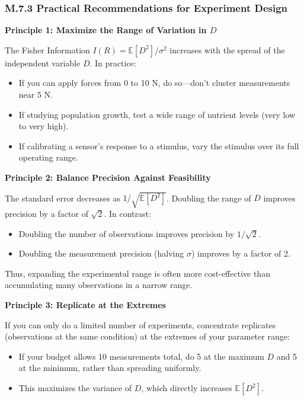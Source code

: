 \documentclass[
]{article}
\providecommand{\tightlist}{%
  \setlength{\itemsep}{0pt}\setlength{\parskip}{0pt}}
\begin{document}
\subsubsection{M.7.3 Practical Recommendations for Experiment
Design}\label{m.7.3-practical-recommendations-for-experiment-design}

\textbf{Principle 1: Maximize the Range of Variation in \(D\)}

The Fisher Information \(I(R) = \mathbb{E}[D^2]/\sigma^2\) increases
with the spread of the independent variable \(D\). In practice:

\begin{itemize}
\tightlist
\item
  If you can apply forces from 0 to 10 N, do so---don't cluster
  measurements near 5 N.
\item
  If studying population growth, test a wide range of nutrient levels
  (very low to very high).
\item
  If calibrating a sensor's response to a stimulus, vary the stimulus
  over its full operating range.
\end{itemize}

\textbf{Principle 2: Balance Precision Against Feasibility}

The standard error decreases as \(1/\sqrt{\mathbb{E}[D^2]}\). Doubling
the range of \(D\) improves precision by a factor of \(\sqrt{2}\). In
contrast:

\begin{itemize}
\tightlist
\item
  Doubling the number of observations improves precision by
  \(1/\sqrt{2}\).
\item
  Doubling the measurement precision (halving \(\sigma\)) improves by a
  factor of 2.
\end{itemize}

Thus, expanding the experimental range is often more cost-effective than
accumulating many observations in a narrow range.

\textbf{Principle 3: Replicate at the Extremes}

If you can only do a limited number of experiments, concentrate
replicates (observations at the same condition) at the extremes of your
parameter range:

\begin{itemize}
\tightlist
\item
  If your budget allows 10 measurements total, do 5 at the maximum \(D\)
  and 5 at the minimum, rather than spreading uniformly.
\item
  This maximizes the variance of \(D\), which directly increases
  \(\mathbb{E}[D^2]\).
\end{itemize}
\end{document}
